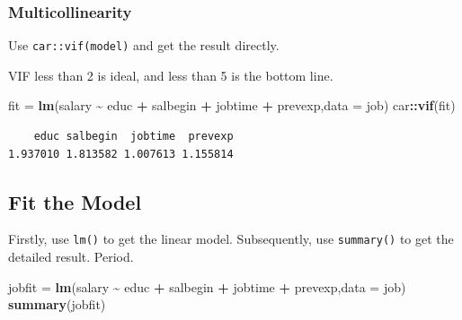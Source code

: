\documentclass[
]{ctexart}
\newenvironment{Shaded}{\begin{snugshade}}{\end{snugshade}}
\newcommand{\AttributeTok}[1]{\textcolor[rgb]{0.13,0.29,0.53}{#1}}
\newcommand{\FunctionTok}[1]{\textcolor[rgb]{0.13,0.29,0.53}{\textbf{#1}}}
\newcommand{\NormalTok}[1]{#1}
\newcommand{\OtherTok}[1]{\textcolor[rgb]{0.56,0.35,0.01}{#1}}
\newcommand{\SpecialCharTok}[1]{\textcolor[rgb]{0.81,0.36,0.00}{\textbf{#1}}}
\begin{document}
\hypertarget{multicollinearity-1}{%
\subsubsection{Multicollinearity}\label{multicollinearity-1}}

Use \texttt{car::vif(model)} and get the result directly.

VIF less than 2 is ideal, and less than 5 is the bottom line.

\begin{Shaded}
\begin{Highlighting}[]
\NormalTok{fit }\OtherTok{=} \FunctionTok{lm}\NormalTok{(salary }\SpecialCharTok{\textasciitilde{}}\NormalTok{ educ }\SpecialCharTok{+}\NormalTok{ salbegin }\SpecialCharTok{+}\NormalTok{ jobtime }\SpecialCharTok{+}\NormalTok{ prevexp,}\AttributeTok{data =}\NormalTok{ job)}
\NormalTok{car}\SpecialCharTok{::}\FunctionTok{vif}\NormalTok{(fit)}
\end{Highlighting}
\end{Shaded}

\begin{verbatim}
    educ salbegin  jobtime  prevexp 
1.937010 1.813582 1.007613 1.155814 
\end{verbatim}

\hypertarget{fit-the-model-5}{%
\subsection{Fit the Model}\label{fit-the-model-5}}

Firstly, use \texttt{lm()} to get the linear model. Subsequently, use
\texttt{summary()} to get the detailed result. Period.

\begin{Shaded}
\begin{Highlighting}[]
\NormalTok{jobfit }\OtherTok{=} \FunctionTok{lm}\NormalTok{(salary }\SpecialCharTok{\textasciitilde{}}\NormalTok{ educ }\SpecialCharTok{+}\NormalTok{ salbegin }\SpecialCharTok{+}\NormalTok{ jobtime }\SpecialCharTok{+}\NormalTok{ prevexp,}\AttributeTok{data =}\NormalTok{ job)}
\FunctionTok{summary}\NormalTok{(jobfit)}
\end{Highlighting}
\end{Shaded}
\end{document}
